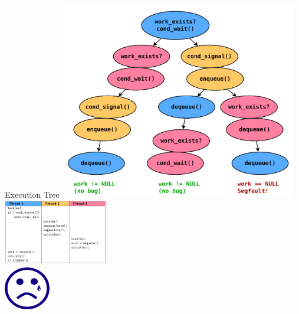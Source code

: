 \documentclass[xcolor=dvipsnames]{beamer}
\begin{document}
\begin{frame}{Execution Tree}
		\includegraphics[width=0.78\textwidth]{execution-tree-full.pdf} \\
		\vspace{-3in}
		\hspace{3in}
		\includegraphics[width=0.34\textwidth]{table-2.png}
		\\
		\vspace{1.2in}
		\hspace{3.7in}
		\includegraphics[width=0.15\textwidth]{frownie.png}
\end{frame}


\end{document}
